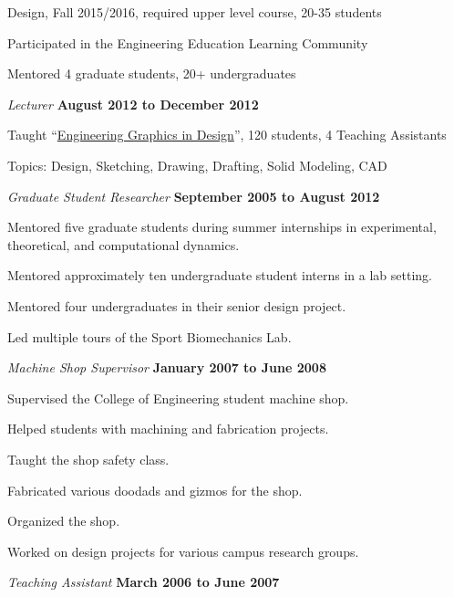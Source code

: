 \documentclass[10pt]{article}
\newenvironment{outerlist}[1][\enskip\textbullet]%
        {\begin{itemize}[#1]}{\end{itemize}%
         \vspace{-.6\baselineskip}}
\newenvironment{innerlist}[1][\enskip\textbullet]%
        {\begin{compactitem}[#1]}{\end{compactitem}}
\begin{document}
\begin{outerlist}
\begin{innerlist}
{      Design}, Fall 2015/2016, required upper level course, 20-35 students
      \item Participated in the Engineering Education Learning Community
      \item Mentored 4 graduate students, 20+ undergraduates
    \end{innerlist}
  \item[] \textit{Lecturer}%
        \hfill \textbf{August 2012 to December 2012}
  \begin{innerlist}
  \item Taught
    ``\href{http://mae.ucdavis.edu/~biosport/jkm/courses/eng4/}{Engineering
    Graphics in Design}'', 120 students, 4 Teaching Assistants
    \item Topics: Design, Sketching, Drawing, Drafting, Solid Modeling, CAD
  \end{innerlist}
  \item[] \textit{Graduate Student Researcher}%
        \hfill \textbf{September 2005 to August 2012}
  \begin{innerlist}
    \item Mentored five graduate students during summer internships in
      experimental, theoretical, and computational dynamics.
    \item Mentored approximately ten undergraduate student interns in a lab
      setting.
    \item Mentored four undergraduates in their senior design project.
    \item Led multiple tours of the Sport Biomechanics Lab.
  \end{innerlist}
  \item[] \textit{Machine Shop Supervisor}%
    \hfill \textbf{January 2007 to June 2008}
  \begin{innerlist}
    \item Supervised the College of Engineering student machine shop.
    \item Helped students with machining and fabrication projects.
    \item Taught the shop safety class.
    \item Fabricated various doodads and gizmos for the shop.
    \item Organized the shop.
    \item Worked on design projects for various campus research groups.
  \end{innerlist}
  \item[] \textit{Teaching Assistant}%
    \hfill \textbf{March 2006 to June 2007}

\end{outerlist}
\end{document}
